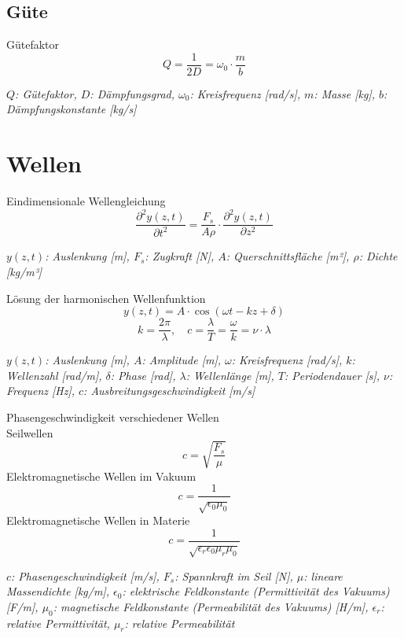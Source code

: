 \documentclass[a5paper,10pt]{article}
\newenvironment{displayformula}
{
	\begin{framed}
		\color{formulaColor}
	}
	{\end{framed}}
\newcommand{\formulalegend}[1]{%
	\par\vspace{0.5ex}%
	{{\color{legendColor}\RaggedRight\small\textit{#1}}}%
	\par\vspace{1.5ex}%
}
\begin{document}
\subsection{Güte}

\begin{displayformula}
	Gütefaktor
	\[
	Q = \frac{1}{2D} = \omega_0 \cdot \frac{m}{b}
	\]
\end{displayformula}
\formulalegend{
	\( Q \): Gütefaktor, \( D \): Dämpfungsgrad, \( \omega_0 \): Kreisfrequenz [rad/s], \( m \): Masse [kg], \( b \): Dämpfungskonstante [kg/s]
}
\newpage
\section{Wellen}

\begin{displayformula}
	Eindimensionale Wellengleichung
	\[
	\frac{\partial^2 y(z,t)}{\partial t^2} = \frac{F_s}{A \rho} \cdot \frac{\partial^2 y(z,t)}{\partial z^2}
	\]
\end{displayformula}
\formulalegend{
	\( y(z,t) \): Auslenkung [m], \( F_s \): Zugkraft [N], \( A \): Querschnittsfläche [m²], \( \rho \): Dichte [kg/m³]
}

\begin{displayformula}
	Lösung der harmonischen Wellenfunktion
	\[
	y(z, t) = A \cdot \cos(\omega t - kz + \delta)
	\]
	\[
	k = \frac{2\pi}{\lambda}, \quad c = \frac{\lambda}{T} = \frac{\omega}{k} = \nu \cdot \lambda
	\]
\end{displayformula}
\formulalegend{
	\( y(z,t) \): Auslenkung [m], \( A \): Amplitude [m], \( \omega \): Kreisfrequenz [rad/s], \( k \): Wellenzahl [rad/m], \( \delta \): Phase [rad], \( \lambda \): Wellenlänge [m], \( T \): Periodendauer [s], \( \nu \): Frequenz [Hz], \( c \): Ausbreitungsgeschwindigkeit [m/s]
}

\newpage
\begin{displayformula}
	Phasengeschwindigkeit verschiedener Wellen \\ 
	Seilwellen
	\[
	c = \sqrt{\frac{F_s}{\mu}}
	\]
	Elektromagnetische Wellen im Vakuum
	\[
	c = \frac{1}{\sqrt{\epsilon_0 \mu_0}}
	\]
	Elektromagnetische Wellen in Materie
	\[
	c = \frac{1}{\sqrt{\epsilon_r \epsilon_0 \mu_r \mu_0}}
	\]
\end{displayformula}
\formulalegend{
	\( c \): Phasengeschwindigkeit [m/s], 
	\( F_s \): Spannkraft im Seil [N], 
	\( \mu \): lineare Massendichte [kg/m], 
	\( \epsilon_0 \): elektrische Feldkonstante (Permittivität des Vakuums) [F/m], 
	\( \mu_0 \): magnetische Feldkonstante (Permeabilität des Vakuums) [H/m], 
	\( \epsilon_r \): relative Permittivität, 
	\( \mu_r \): relative Permeabilität
}
\newpage
\end{document}
